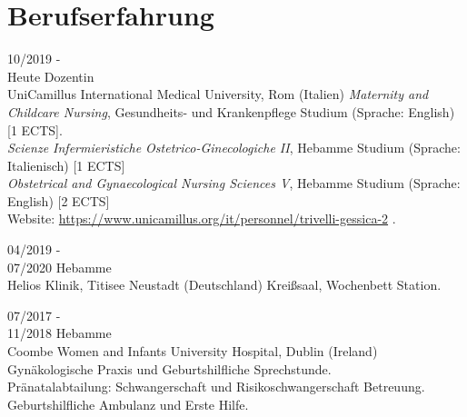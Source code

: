\documentclass[11pt]{friggeri-cv}
\begin{document}
\vspace{-35pt}
\section{Berufserfahrung}
\begin{entrylist}
  \entry
  {10/2019 -\\Heute}
  {Dozentin}
  {\\UniCamillus International Medical University, Rom (Italien)}
  {
    \emph{Maternity and Childcare Nursing},
    Gesundheits- und Krankenpflege Studium (Sprache: English) [1 ECTS].\\
    \emph{Scienze Infermieristiche Ostetrico-Ginecologiche II},
    Hebamme Studium (Sprache: Italienisch) [1 ECTS] \\
    \emph{Obstetrical and Gynaecological Nursing Sciences V},
    Hebamme Studium (Sprache: English) [2 ECTS] \\
    Website:
    \footnotesize{\url{https://www.unicamillus.org/it/personnel/trivelli-gessica-2}} .
  }

  \entry
  {04/2019 -\\07/2020}
  {Hebamme}
  {\\Helios Klinik, Titisee Neustadt (Deutschland)}
  {Kreißsaal, Wochenbett Station.}

  \entry
  {07/2017 -\\11/2018}
  {Hebamme}
  {\\Coombe Women and Infants University Hospital, Dublin (Ireland)}
  {
    Gyn\"{a}kologische Praxis und Geburtshilfliche Sprechstunde.\\
    Pr\"{a}natalabtailung: Schwangerschaft und Risikoschwangerschaft Betreuung.\\
    Geburtshilfliche Ambulanz und Erste Hilfe.
  }
\end{entrylist}
%
%
\vspace{-10pt}
\end{document}
